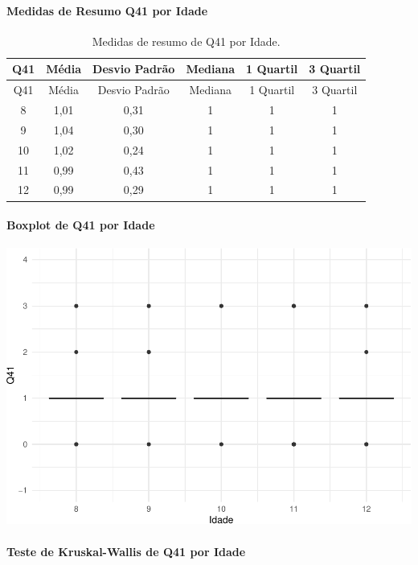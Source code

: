 \documentclass[]{article}
\let\oldparagraph\paragraph
\renewcommand{\paragraph}[1]{\oldparagraph{#1}\mbox{}}
\begin{document}
\cleardoublepage

\hypertarget{medidas-de-resumo-q41-por-idade}{%
\paragraph{Medidas de Resumo Q41 por Idade}\label{medidas-de-resumo-q41-por-idade}}

\begin{longtable}[]{@{}cccccc@{}}
\caption{\label{tab:unnamed-chunk-1630}Medidas de resumo de Q41 por Idade.}\tabularnewline
\toprule
Q41 & Média & Desvio Padrão & Mediana & 1 Quartil & 3 Quartil\tabularnewline
\midrule
\endfirsthead
\toprule
Q41 & Média & Desvio Padrão & Mediana & 1 Quartil & 3 Quartil\tabularnewline
\midrule
\endhead
8 & 1,01 & 0,31 & 1 & 1 & 1\tabularnewline
9 & 1,04 & 0,30 & 1 & 1 & 1\tabularnewline
10 & 1,02 & 0,24 & 1 & 1 & 1\tabularnewline
11 & 0,99 & 0,43 & 1 & 1 & 1\tabularnewline
12 & 0,99 & 0,29 & 1 & 1 & 1\tabularnewline
\bottomrule
\end{longtable}

\hypertarget{boxplot-de-q41-por-idade}{%
\paragraph{Boxplot de Q41 por Idade}\label{boxplot-de-q41-por-idade}}

\begin{center}\includegraphics[width=0.75\linewidth]{relatorio_covid19_files/figure-latex/unnamed-chunk-1631-1} \end{center}

\hypertarget{teste-de-kruskal-wallis-de-q41-por-idade}{%
\paragraph{Teste de Kruskal-Wallis de Q41 por Idade}\label{teste-de-kruskal-wallis-de-q41-por-idade}}
\end{document}
